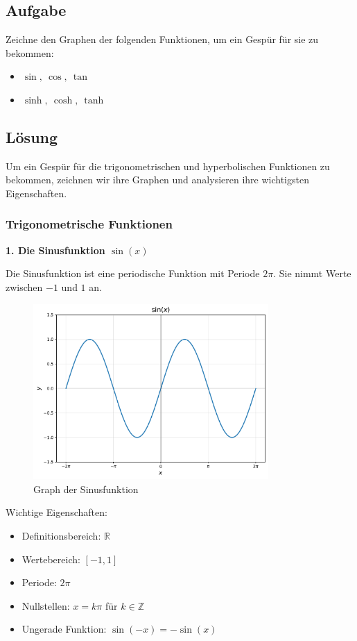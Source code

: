 \documentclass{article}
\begin{document}
\subsection*{Aufgabe}
Zeichne den Graphen der folgenden Funktionen, um ein Gespür für sie zu bekommen:
\begin{itemize}
  \item $\sin, \ \cos, \ \tan$
  \item $\sinh, \ \cosh, \ \tanh$
\end{itemize}

\subsection*{Lösung}

Um ein Gespür für die trigonometrischen und hyperbolischen Funktionen zu bekommen, zeichnen wir ihre Graphen und analysieren ihre wichtigsten Eigenschaften.

\subsubsection*{Trigonometrische Funktionen}

\textbf{1. Die Sinusfunktion $\sin(x)$}

Die Sinusfunktion ist eine periodische Funktion mit Periode $2\pi$. Sie nimmt Werte zwischen $-1$ und $1$ an.

\begin{figure}[!htbp]
\centering
\includegraphics[width=0.8\textwidth]{sin.pdf}
\caption{Graph der Sinusfunktion}
\end{figure}

Wichtige Eigenschaften:
\begin{itemize}
\item Definitionsbereich: $\mathbb{R}$
\item Wertebereich: $[-1, 1]$
\item Periode: $2\pi$
\item Nullstellen: $x = k\pi$ für $k \in \mathbb{Z}$
\item Ungerade Funktion: $\sin(-x) = -\sin(x)$
\end{itemize}
\end{document}
